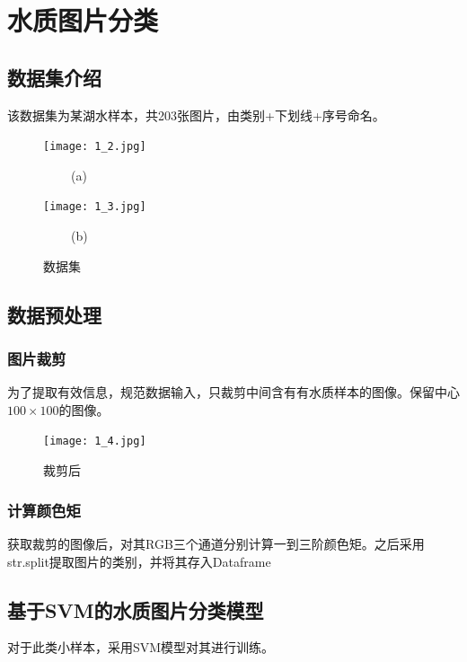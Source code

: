 \documentclass[withoutpreface,bwprint]{cumcmthesis} %
\title{}
\begin{document}
	
	
	 
	\newpage
	
	\tableofcontents
	
	\newpage
	\section{水质图片分类}
	\subsection{数据集介绍}
	\par 该数据集为某湖水样本，共203张图片，由类别+下划线+序号命名。
	\begin{figure}[H]
		\centering
		\begin{minipage}[t]{0.48\textwidth}
			\centering
			\texttt{[image: 1\_2.jpg]}
			\centerline{$\ \ \ \ \ \ \ \ \ \ $(a)}
		\end{minipage}
		\begin{minipage}[t]{0.48\textwidth}
			\centering
			\texttt{[image: 1\_3.jpg]}
			\centerline{$\ \ \ \ \ \ \ \ \ \ $(b)}
		\end{minipage}
		
		\caption{数据集}
	\end{figure}
	
	\subsection{数据预处理}
	
	
	\subsubsection{图片裁剪}
	\par 为了提取有效信息，规范数据输入，只裁剪中间含有有水质样本的图像。保留中心$100\times 100$的图像。
	\begin{figure}[H]
		\centering
		\centerline{\texttt{[image: 1\_4.jpg]}}  
		\begin{center}
			\caption{裁剪后}
		\end{center}
	\end{figure}
	\subsubsection{计算颜色矩}
	\par 获取裁剪的图像后，对其RGB三个通道分别计算一到三阶颜色矩。之后采用str.split提取图片的类别，并将其存入Dataframe
	
	
	\subsection{基于SVM的水质图片分类模型}
	\par 对于此类小样本，采用SVM模型对其进行训练。	
	
\end{document}
